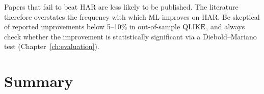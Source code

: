 \begin{warning}
Papers that fail to beat HAR are less likely to be published.
The literature therefore overstates the frequency with which ML improves on HAR.
Be skeptical of reported improvements below 5--10\% in out-of-sample $\operatorname{QLIKE}$, and always check whether the improvement is statistically significant via a Diebold--Mariano test (Chapter~\ref{ch:evaluation}).
\end{warning}


\section*{Summary}

